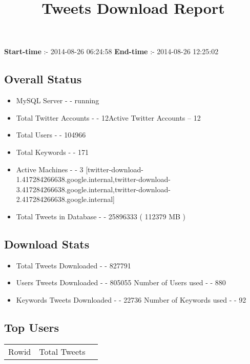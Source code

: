 \documentclass{article}\usepackage[T1]{fontenc}
\begin{document}
\title{\textbf{Tweets Download Report}}
               \date{}
                \maketitle
               \centerline{\textbf{Start-time} :- 2014-08-26 06:24:58 \hspace{40pt} \textbf{End-time} :- 2014-08-26 12:25:02}               \subsection*{Overall Status}                \begin{itemize}                \item MySQL Server - - running               \item Total Twitter Accounts - - 12\newline Active Twitter Accounts -- 12               \item Total Users - - 104966               \item Total Keywords - - 171               \item Active Machines - - 3 [twitter-download-1.417284266638.google.internal,twitter-download-3.417284266638.google.internal,twitter-download-2.417284266638.google.internal]               \item Total Tweets in Database - - 25896333 ( 112379 MB )               \end{itemize}               \subsection*{Download Stats}                \begin{itemize}                \item Total Tweets Downloaded - - 827791               \item Users Tweets Downloaded - - 805055 \newline Number of Users used - - 880               \item Keywords Tweets Downloaded - - 22736 \newline Number of Keywords used - - 92              \end{itemize}              \subsection*{Top Users}\begin{tabular}{|c|c|c|}         \hline         Rowid & Total Tweets \\ 

\end{tabular}
\end{document}

